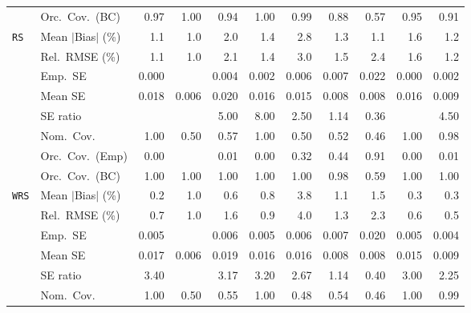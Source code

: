 \begin{landscape}
\begin{longtable}{llrrrrrrrrr}
 & Orc.\ Cov.\ (BC) & \cellcolor{rankthree}0.97 & 1.00 & \cellcolor{ranktwo}0.94 & 1.00 & 0.99 & 0.88 & 0.57 & \cellcolor{rankone}0.95 & 0.91 \\
\addlinespace[2pt]
\quad \texttt{RS} & Mean $|$Bias$|$ (\%) & \cellcolor{ranktwo}1.1 & \cellcolor{rankone}1.0 & 2.0 & 1.4 & 2.8 & 1.3 & \cellcolor{ranktwo}1.1 & 1.6 & \cellcolor{rankthree}1.2 \\
 & Rel.\ RMSE (\%) & \cellcolor{ranktwo}1.1 & \cellcolor{rankone}1.0 & 2.1 & 1.4 & 3.0 & 1.5 & 2.4 & 1.6 & \cellcolor{rankthree}1.2 \\
 & Emp.\ SE & 0.000 &  & 0.004 & 0.002 & 0.006 & 0.007 & 0.022 & 0.000 & 0.002 \\
 & Mean SE & 0.018 & 0.006 & 0.020 & 0.016 & 0.015 & 0.008 & 0.008 & 0.016 & 0.009 \\
 & SE ratio &  &  & 5.00 & 8.00 & \cellcolor{rankthree}2.50 & \cellcolor{rankone}1.14 & \cellcolor{ranktwo}0.36 &  & 4.50 \\
 & Nom.\ Cov. & \cellcolor{ranktwo}1.00 & 0.50 & \cellcolor{rankthree}0.57 & \cellcolor{ranktwo}1.00 & 0.50 & 0.52 & 0.46 & \cellcolor{ranktwo}1.00 & \cellcolor{rankone}0.98 \\
 & Orc.\ Cov.\ (Emp) & 0.00 &  & 0.01 & 0.00 & \cellcolor{rankthree}0.32 & \cellcolor{ranktwo}0.44 & \cellcolor{rankone}0.91 & 0.00 & 0.01 \\
 & Orc.\ Cov.\ (BC) & \cellcolor{ranktwo}1.00 & \cellcolor{ranktwo}1.00 & \cellcolor{ranktwo}1.00 & \cellcolor{ranktwo}1.00 & \cellcolor{ranktwo}1.00 & \cellcolor{rankone}0.98 & \cellcolor{rankthree}0.59 & \cellcolor{ranktwo}1.00 & \cellcolor{ranktwo}1.00 \\
\addlinespace[2pt]
\quad \texttt{WRS} & Mean $|$Bias$|$ (\%) & \cellcolor{rankone}0.2 & 1.0 & \cellcolor{rankthree}0.6 & 0.8 & 3.8 & 1.1 & 1.5 & \cellcolor{ranktwo}0.3 & \cellcolor{ranktwo}0.3 \\
 & Rel.\ RMSE (\%) & \cellcolor{rankthree}0.7 & 1.0 & 1.6 & 0.9 & 4.0 & 1.3 & 2.3 & \cellcolor{ranktwo}0.6 & \cellcolor{rankone}0.5 \\
 & Emp.\ SE & 0.005 &  & 0.006 & 0.005 & 0.006 & 0.007 & 0.020 & 0.005 & 0.004 \\
 & Mean SE & 0.017 & 0.006 & 0.019 & 0.016 & 0.016 & 0.008 & 0.008 & 0.015 & 0.009 \\
 & SE ratio & 3.40 &  & 3.17 & 3.20 & 2.67 & \cellcolor{rankone}1.14 & \cellcolor{ranktwo}0.40 & 3.00 & \cellcolor{rankthree}2.25 \\
 & Nom.\ Cov. & \cellcolor{rankone}1.00 & 0.50 & \cellcolor{ranktwo}0.55 & \cellcolor{rankone}1.00 & 0.48 & \cellcolor{rankthree}0.54 & 0.46 & \cellcolor{rankone}1.00 & \cellcolor{rankone}0.99 \\

\end{longtable}
\end{landscape}
